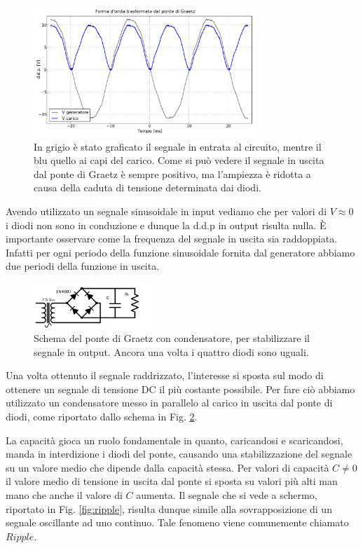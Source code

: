 \begin{figure}[h]
\center
	\includegraphics[width=0.75\textwidth]{graetz.pdf}
	\caption{In grigio è stato graficato il segnale in entrata al circuito, mentre il blu quello ai capi del carico. Come si può vedere il segnale in uscita dal ponte di Graetz è sempre positivo, ma l'ampiezza è ridotta a causa della caduta di tensione determinata dai diodi.}
	\label{fig:graetz}
\end{figure}

Avendo utilizzato un segnale sinusoidale in input vediamo che per valori di $V \approx 0$ i diodi non sono in conduzione e dunque la d.d.p in output risulta nulla. \`E importante osservare come la frequenza del segnale in uscita sia raddoppiata. Infatti per ogni periodo della funzione sinusoidale fornita dal generatore abbiamo due periodi della funzione in uscita.\\

\begin{figure}
	\includegraphics[width=0.4\textwidth]{schema_ripple.pdf}
	\caption{Schema del ponte di Graetz con condensatore, per stabilizzare il segnale in output. Ancora una volta i quattro diodi sono uguali.}
	\label{fig:schema_ripple}
\end{figure}

Una volta ottenuto il segnale raddrizzato, l'interesse si sposta sul modo di ottenere un segnale di tensione DC il più costante possibile. Per fare ciò abbiamo utilizzato un condensatore messo in parallelo al carico in uscita dal ponte di diodi, come riportato dallo schema in Fig. \ref{fig:schema_ripple}.

La capacità gioca un ruolo fondamentale in quanto, caricandosi e scaricandosi, manda in interdizione i diodi del ponte, causando una stabilizzazione del segnale su un valore medio che dipende dalla capacità stessa. Per valori di capacità $C\neq 0$ il valore medio di tensione in uscita dal ponte si sposta su valori più alti man mano che anche il valore di $C$ aumenta.
Il segnale che si vede a schermo, riportato in Fig. \ref{fig:ripple}, risulta dunque simile alla sovrapposizione di un segnale oscillante ad uno continuo. Tale fenomeno viene comunemente chiamato $Ripple$.

